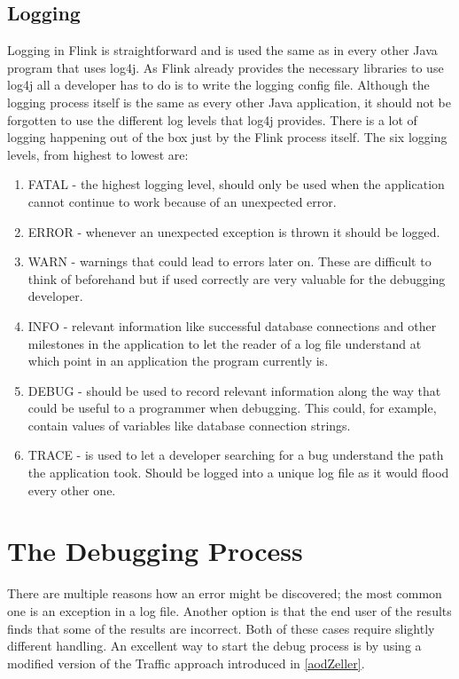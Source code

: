 \subsection{Logging}
Logging in Flink is straightforward and is used the same as in every other Java program that uses log4j. As Flink already provides the necessary libraries to use log4j all a developer has to do is to write the logging config file. Although the logging process itself is the same as every other Java application, it should not be forgotten to use the different log levels that log4j provides. There is a lot of logging happening out of the box just by the Flink process itself. The six logging levels, from highest to lowest are:
\begin{enumerate}
  \item FATAL - the highest logging level, should only be used when the application cannot continue to work because of an unexpected error.
  \item ERROR - whenever an unexpected exception is thrown it should be logged.
  \item WARN - warnings that could lead to errors later on. These are difficult to think of beforehand but if used correctly are very valuable for the debugging developer.
  \item INFO - relevant information like successful database connections and other milestones in the application to let the reader of a log file understand at which point in an application the program currently is.
  \item DEBUG - should be used to record relevant information along the way that could be useful to a programmer when debugging. This could, for example, contain values of variables like database connection strings.
  \item TRACE - is used to let a developer searching for a bug understand the path the application took. Should be logged into a unique log file as it would flood every other one.
\end{enumerate}

\section{The Debugging Process}

There are multiple reasons how an error might be discovered; the most common one is an exception in a log file. Another option is that the end user of the results finds that some of the results are incorrect. Both of these cases require slightly different handling. An excellent way to start the debug process is by using a modified version of the Traffic approach introduced in \ref{aodZeller}.


